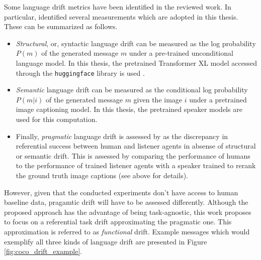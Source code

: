 Some language drift metrics have been identified in the reviewed work. In particular, \cite{lazaridou2020multi} identified several measurements which are adopted in this thesis. These can be summarized as follows. 
\begin{itemize}
	\item \textit{Structural}, or, syntactic language drift can be measured as the log probability $P(m)$ of the generated message $m$ under a pre-trained unconditional language model. In this thesis, the pretrained Transformer XL model accessed through the \texttt{huggingface} library is used \parencite{dai2019transformer, wolf2019huggingface}.
	\item \textit{Semantic} language drift can be measured as the conditional log probability $P(m|i)$ of the generated message $m$ given the image $i$ under a pretrained image captioning model. In this thesis, the pretrained speaker models are used for this computation. %
	\item Finally, \textit{pragmatic} language drift is assessed by \cite{lazaridou2020multi} as the discrepancy in referential success between human and listener agents in absense of structural or semantic drift. This is assessed by comparing the performance of humans to the performance of trained listener agents with a speaker trained to rerank the ground truth image captions (see above for details). 
\end{itemize}

However, given that the conducted experiments don't have access to human baseline data, pragamtic drift will have to be assessed differently. Although the proposed approach has the advantage of being task-agnostic, this work proposes to focus on a referential task drift approximating the pragmatic one. This approximation is referred to as \textit{functional} drift. Example messages which would exemplify all three kinds of language drift are presented in Figure \ref{fig:coco_drift_example}.

